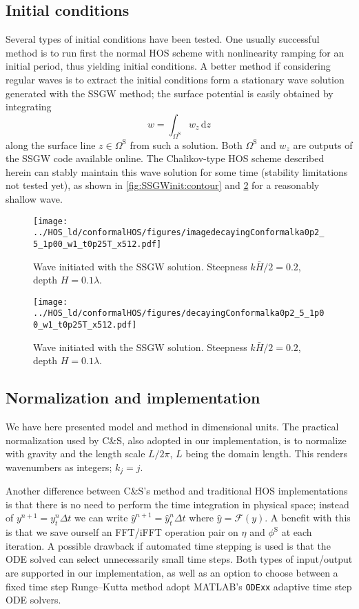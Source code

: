 \documentclass[a4paper,12pt]{article}
\newcommand{\mr}{\mathrm}
\newcommand{\mc}{\mathcal}
\renewcommand{\S}{^\mr{S}}
\renewcommand{\_}[1]{_\mr{#1}}
\newcommand{\w}{w}
\newcommand{\refCS}{C\&S}
\newcommand{\z}{z}
\renewcommand{\w}{w}
\newcommand{\FF}{\mc F}
\begin{document}
\subsection*{Initial conditions}
Several types of initial conditions have been tested. 
One usually successful method is to run first the normal HOS scheme with nonlinearity ramping for an initial period, thus yielding initial conditions.
A better method if considering regular waves is to extract the initial conditions form a stationary wave solution generated with the SSGW \citep{clamond2018accurate} method;
the surface potential is easily obtained by integrating
\[\w = \int_{\Omega\S}\! \w_\z \,\mr d z\] 
along the surface line $z\in\Omega\S$ from such a solution. 
Both $\Omega\S$ and  $\w_\z$ are outputs of the SSGW code available online. 
The Chalikov-type HOS scheme described herein can stably maintain this wave solution for some time (stability limitations not tested yet), as shown in \autoref{fig:SSGWinit:contour} and \ref{fig:SSGWinit:eta} for a reasonably shallow wave. 


\begin{figure}[h!ptb]%
\centering
\texttt{[image: ../HOS\_old/conformalHOS/figures/imagedecayingConformalka0p2\_M5\_h1p00\_Nw1\_dt0p25T\_nx512.pdf]}%
\caption{Wave initiated with the SSGW solution. Steepness $k\bar H/2=0.2$, depth $H=0.1\lambda$.}%
\label{fig:SSGWinit:contour}%
\end{figure}
\begin{figure}[h!ptb]%
\centering
\texttt{[image: ../HOS\_old/conformalHOS/figures/decayingConformalka0p2\_M5\_h1p00\_Nw1\_dt0p25T\_nx512.pdf]}%
\caption{Wave initiated with the SSGW solution. Steepness $k\bar H/2=0.2$, depth $H=0.1\lambda$.}%
\label{fig:SSGWinit:eta}%
\end{figure}



\subsection*{Normalization and implementation}
We have here presented model and method in dimensional units. 
The practical normalization used by \refCS{}, also adopted in our implementation, is to normalize with gravity and the length scale $L/2\pi$, $L$ being the domain length. 
This renders wavenumbers as integers; $k_j = j$.

Another difference between \refCS{}'s method and traditional HOS implementations is that there is no need to perform the time integration in physical space; instead of $y^{n+1}=y_t^{n}\Delta t$ we can write $\hat y^{n+1}=\hat y_t^{n}\Delta t$ where $\hat y = \FF(y)$.
A benefit with this is that we save ourself an FFT/iFFT operation pair on $\eta$ and $\phi\S$ at each iteration. 
A possible drawback if automated time stepping is used is that the ODE solved can select unnecessarily small time steps.
Both types of input/output are supported in our implementation, as well as an option to choose between a fixed time step Runge--Kutta method adopt MATLAB's \texttt{ODExx} adaptive time step ODE solvers. 
\end{document}
